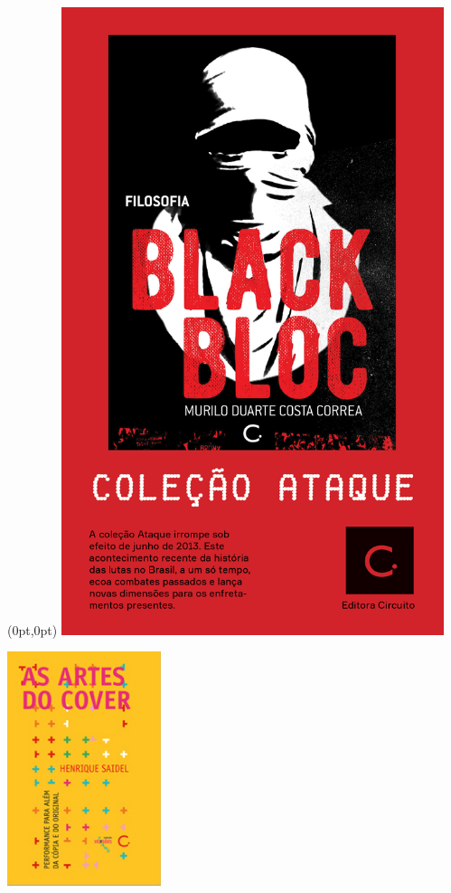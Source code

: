 \pagestyle{circuito}
\label{circuito}

\begin{textblock*}{5.625in}(0pt,0pt)%
\vspace*{-1.45cm}
\hspace*{-1.8cm}\includegraphics*[width=112mm]{./imgs/CIRCUITO.png}
\end{textblock*}

\pagebreak

\hspace{.5cm}

\begin{center}
\hspace*{-2.5cm}
\hspace{2cm}\includegraphics[width=45mm]{./imgs/cover.jpg}
\end{center}

